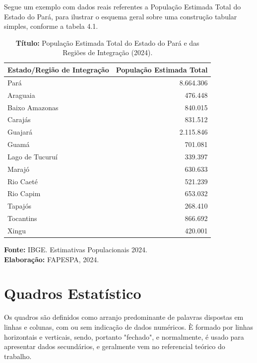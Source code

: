 Segue um exemplo com dados reais referentes a População Estimada Total do Estado do Pará, para ilustrar o esquema geral sobre uma construção tabular simples, conforme a tabela 4.1.



\begin{table}[!htb]
\centering
\caption{\textbf{Título:} População Estimada Total do Estado do Pará e das Regiões de Integração (2024).}
\label{tab:populacao_ri_2024}

\begin{tabular}{l|r}
\hline\hline
\textbf{Estado/Região de Integração} &
\textbf{População Estimada Total} \\
\hline
Pará                 & 8.664.306 \\
Araguaia             &   476.448 \\
Baixo Amazonas       &   840.015 \\
Carajás              &   831.512 \\
Guajará              & 2.115.846 \\
Guamá                &   701.081 \\
Lago de Tucuruí      &   339.397 \\
Marajó               &   630.633 \\
Rio Caeté            &   521.239 \\
Rio Capim            &   653.032 \\
Tapajós              &   268.410 \\
Tocantins            &   866.692 \\
Xingu                &   420.001 \\
\hline\hline
\end{tabular}

\vspace{0.2cm}

\raggedright
\textbf{Fonte:} IBGE. Estimativas Populacionais 2024.\\
\textbf{Elaboração:} FAPESPA, 2024.
\end{table}

\newpage
\section{Quadros Estatístico}

Os quadros são definidos como arranjo predominante de palavras dispostas em linhas e colunas, com ou sem indicação de dados numéricos. È formado por linhas horizontais e verticais, sendo, portanto "fechado", e normalmente, é usado para apresentar dados secundários, e geralmente vem no referencial teórico do trabalho.\vskip0.3cm 


